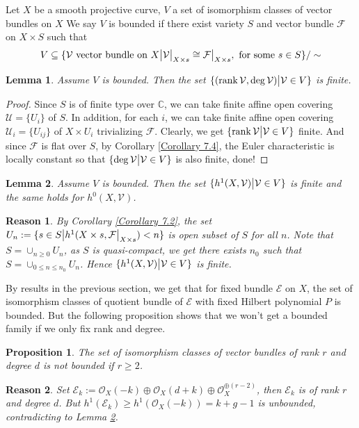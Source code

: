 \documentclass{ctexart}
\newtheorem{proposition}{Proposition}[section]
\newtheorem{lemma}{Lemma}[section]
\newtheorem{reason}{Reason}[section]
\newcommand{\rank}{\operatorname{rank}}
\begin{document}
Let $X$ be a smooth projective curve, $V$ a set of isomorphism classes of vector bundles on $X$
We say $V$ is bounded if there exist variety $S$ and vector bundle $\mathcal{F}$ on $X \times S$ such that
\begin{equation}
    V \subseteq \{\mathcal{V} \text{ vector bundle on } X \big{|} \mathcal{V}\big{|}_{X \times s} \cong \mathcal{F}\big{|}_{X \times s}, \text{ for some } s\in S\}/\sim
\end{equation}
\begin{lemma}
    Assume $V$ is bounded.
    Then the set $\{(\rank \mathcal{V}, \deg \mathcal{V}) \big{|} \mathcal{V}\in V\}$ is finite.
    \label{Lemma 7.13}
\end{lemma}
\begin{proof}
    Since $S$ is of finite type over $\mathbb{C}$, we can take finite affine open covering $\mathcal{U} = \{U_{i}\}$ of $S$.
    In addition, for each $i$, we can take finite affine open covering $\mathcal{U}_{i} = \{U_{ij}\}$ of $X \times U_{i}$ trivializing $\mathcal{F}$.
    Clearly, we get $\{\rank \mathcal{V} \big{|} \mathcal{V}\in V\}$ finite.
    And since $\mathcal{F}$ is flat over $S$, by Corollary \ref{Corollary 7.4},
    the Euler characteristic is locally constant so that $\{\deg \mathcal{V} \big{|} \mathcal{V}\in V\}$ is also finite, done!
\end{proof}
\begin{lemma}
    Assume $V$ is bounded.
    Then the set $\{h^{1}(X, \mathcal{V}) \big{|} \mathcal{V}\in V\}$ is finite and the same holds for $h^{0}(X, \mathcal{V})$.
    \label{Lemma 7.14}
\end{lemma}
\begin{reason}
    By Corollary \ref{Corollary 7.2}, the set $U_{n} := \{s\in S \big{|} h^{1}(X \times s, \mathcal{F}\big{|}_{X \times s}) < n\}$ is open subset of $S$ for all $n$.
    Note that $S = \cup_{n \ge 0} U_{n}$, as $S$ is quasi-compact, we get there exists $n_{0}$ such that $S = \cup_{0 \le n \le n_{0}} U_{n}$.
    Hence $\{h^{1}(X, \mathcal{V}) \big{|} \mathcal{V}\in V\}$ is finite.
\end{reason}
By results in the previous section, we get that for fixed bundle $\mathcal{E}$ on $X$,
the set of isomorphism classes of quotient bundle of $\mathcal{E}$ with fixed Hilbert polynomial $P$ is bounded.
But the following proposition shows that we won't get a bounded family if we only fix rank and degree.
\begin{proposition}
    The set of isomorphism classes of vector bundles of rank $r$ and degree $d$ is not bounded if $r \ge 2$.
    \label{Proposition 7.4}
\end{proposition}
\begin{reason}
    Set $\mathcal{E}_{k} := \mathcal{O}_{X}(-k) \oplus \mathcal{O}_{X}(d + k) \oplus \mathcal{O}_{X}^{\oplus (r - 2)}$,
    then $\mathcal{E}_{k}$ is of rank $r$ and degree $d$.
    But $h^{1}(\mathcal{E}_{k}) \ge  h^{1}(\mathcal{O}_{X}(-k)) = k + g - 1$ is unbounded, contradicting to Lemma \ref{Lemma 7.14}.
\end{reason}
\end{document}
